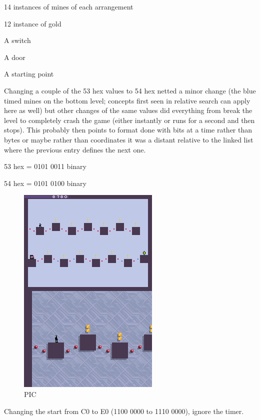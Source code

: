 \documentclass[
]{book}
\begin{document}
14 instances of mines of each arrangement

12 instance of gold

A switch

A door

A starting point

Changing a couple of the 53 hex values to 54 hex netted a minor change (the blue timed mines on the bottom level; concepts first seen in relative search can apply here as well) but other changes of the same values did everything from break the level to completely crash the game (either instantly or runs for a second and then stops). This probably then points to format done with bits at a time rather than bytes or maybe rather than coordinates it was a distant relative to the linked list where the previous entry defines the next one.

53 hex = 0101 0011 binary

54 hex = 0101 0100 binary

\begin{figure}
\centering
\includegraphics{images/181_home_fast6191_romhackingguide_unrenamed_fil___rs_romhackingguideleveleditingworkedNplus14.png}
\caption{PIC}
\end{figure}

Changing the start from C0 to E0 (1100 0000 to 1110 0000), ignore the timer.
\end{document}
